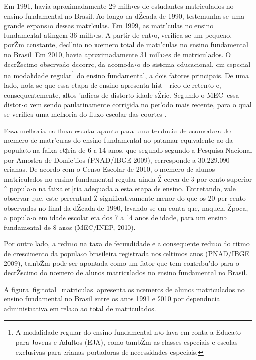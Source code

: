 \documentclass[a4paper, 12pt]{article}
\begin{document}
Em 1991, havia aproximadamente 29 milh›es de estudantes matriculados no ensino fundamental no Brasil. Ao longo da dŽcada de 1990, testemunha-se uma grande expans‹o dessas matr’culas. Em 1999, as matr’culas no ensino fundamental atingem 36 milh›es. A partir de ent‹o, verifica-se um pequeno, porŽm constante, decl’nio no nœmero total de matr’culas no ensino fundamental no Brasil. Em 2010, havia aproximadamente 31 milh›es de matriculados. O decrŽscimo observado decorre, da acomoda‹o do sistema educacional, em especial na modalidade regular\footnote{A modalidade regular do ensino fundamental n‹o lava em conta a Educa‹o para Jovens e Adultos (EJA), como tambŽm as classes especiais e escolas exclusivas para crianas portadoras de necessidades especiais.} do ensino fundamental, a dois fatores principais. De uma lado, nota-se que essa etapa de ensino apresenta hist—rico de reten‹o e, consequentemente, altos ’ndices de distor‹o idade-sŽrie. Segundo o MEC, essa distor‹o vem sendo paulatinamente corrigida no per’odo mais recente, para o qual se verifica uma melhoria do fluxo escolar das coortes \cite{brasil_censo_2010}.

Essa melhoria no fluxo escolar aponta para uma tendncia de acomoda‹o do nœmero de matr’culas do ensino fundamental ao patamar equivalente ao da popula‹o na faixa et‡ria de 6 a 14 anos, que segundo segundo a Pesquisa Nacional por Amostra de Domic’lios (PNAD/IBGE 2009), corresponde a 30.229.090 crianas. De acordo com o Censo Escolar de 2010, o nœmero de alunos matriculados no ensino fundamental regular ainda Ž cerca de 3 por cento superior ˆ popula‹o na faixa et‡ria adequada a esta etapa de ensino. Entretando, vale observar que, este percentual Ž significativamente menor do que os 20 por cento observados no final da dŽcada de 1990, levando-se em conta que, naquela Žpoca, a popula‹o em idade escolar era dos 7 a 14 anos de idade, para um ensino fundamental de 8 anos (MEC/INEP, 2010). 

Por outro lado, a redu‹o na taxa de fecundidade e a consequente redu‹o do ritmo de crescimento da popula‹o brasileira registrada nos œltimos anos (PNAD/IBGE 2009), tambŽm pode ser apontada como um fator que tem contribu’do para o decrŽscimo do nœmero de alunos matriculados no ensino fundamental no Brasil.

A figura \ref{fig:total_matriculas} apresenta os nœmeros de alunos matriculados no ensino fundamental no Brasil entre os anos 1991 e 2010 por dependncia administrativa em rela‹o ao total de matriculados. 
\end{document}

